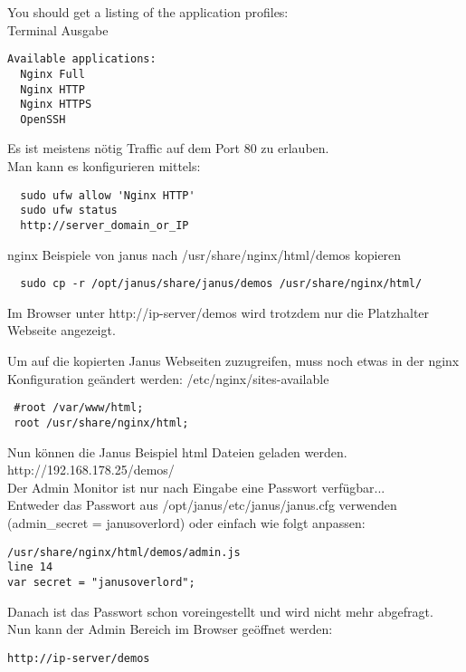 You should get a listing of the application profiles:\\
Terminal Ausgabe
\begin{verbatim}
Available applications:
  Nginx Full
  Nginx HTTP
  Nginx HTTPS
  OpenSSH
\end{verbatim}

Es ist meistens nötig Traffic auf dem Port 80 zu erlauben.\\
Man kann es konfigurieren mittels:
\begin{verbatim}
  sudo ufw allow 'Nginx HTTP'
  sudo ufw status
  http://server_domain_or_IP
\end{verbatim}

nginx Beispiele von janus nach /usr/share/nginx/html/demos kopieren
\begin{verbatim}
  sudo cp -r /opt/janus/share/janus/demos /usr/share/nginx/html/
\end{verbatim}
Im Browser unter http://ip-server/demos
wird trotzdem nur die Platzhalter Webseite angezeigt.

Um auf die kopierten Janus Webseiten zuzugreifen, muss noch etwas in der nginx Konfiguration geändert werden: /etc/nginx/sites-available
\begin{verbatim}
 #root /var/www/html;
 root /usr/share/nginx/html;
\end{verbatim}
Nun können die  Janus Beispiel html Dateien geladen werden.\\
http://192.168.178.25/demos/\\

Der Admin Monitor ist nur nach Eingabe eine Passwort verfügbar...\\
Entweder das Passwort aus /opt/janus/etc/janus/janus.cfg verwenden \\
(admin\_secret = janusoverlord) oder einfach wie folgt anpassen:
\begin{verbatim}
/usr/share/nginx/html/demos/admin.js
line 14
var secret = "janusoverlord";
\end{verbatim}
Danach ist das Passwort schon voreingestellt und wird nicht mehr abgefragt.\\
Nun kann der Admin Bereich im Browser geöffnet werden:
\begin{verbatim}
http://ip-server/demos
\end{verbatim}

